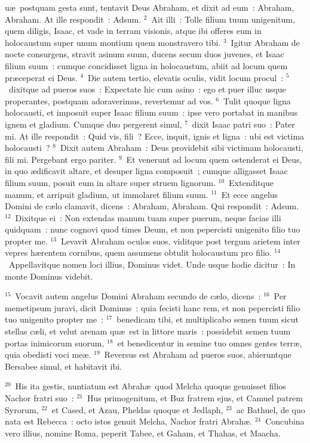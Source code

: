 \bchapter
{}u\ae\ postquam gesta sunt, tentavit Deus Abraham, et dixit ad eum~: Abraham, Abraham. At ille respondit~: Adsum.
${}^{2}$~Ait illi~: Tolle filium tuum unigenitum, quem diligis, Isaac, et vade in terram visionis, atque ibi offeres eum in holocaustum super unum montium quem monstravero tibi.
${}^{3}$~Igitur Abraham de nocte consurgens, stravit asinum suum, ducens secum duos juvenes, et Isaac filium suum~: cumque concidisset ligna in holocaustum, abiit ad locum quem pr\ae ceperat ei Deus.
${}^{4}$~Die autem tertio, elevatis oculis, vidit locum procul~:
${}^{5}$~dixitque ad pueros suos~: Expectate hic cum asino~: ego et puer illuc usque properantes, postquam adoraverimus, revertemur ad vos.
${}^{6}$~Tulit quoque ligna holocausti, et imposuit super Isaac filium suum~: ipse vero portabat in manibus ignem et gladium. Cumque duo pergerent simul,
${}^{7}$~dixit Isaac patri suo~: Pater mi. At ille respondit~: Quid vis, fili~? Ecce, inquit, ignis et ligna~: ubi est victima holocausti~?
${}^{8}$~Dixit autem Abraham~: Deus providebit sibi victimam holocausti, fili mi. Pergebant ergo pariter.
${}^{9}$~Et venerunt ad locum quem ostenderat ei Deus, in quo \ae dificavit altare, et desuper ligna composuit~; cumque alligasset Isaac filium suum, posuit eum in altare super struem lignorum.
${}^{10}$~Extenditque manum, et arripuit gladium, ut immolaret filium suum.
${}^{11}$~Et ecce angelus Domini de c\ae lo clamavit, dicens~: Abraham, Abraham. Qui respondit~: Adsum.
${}^{12}$~Dixitque ei~: Non extendas manum tuam super puerum, neque facias illi quidquam~: nunc cognovi quod times Deum, et non pepercisti unigenito filio tuo propter me.
${}^{13}$~Levavit Abraham oculos suos, viditque post tergum arietem inter vepres h\ae rentem cornibus, quem assumens obtulit holocaustum pro filio.
${}^{14}$~Appellavitque nomen loci illius, Dominus videt. Unde usque hodie dicitur~: In monte Dominus videbit.


${}^{15}$~Vocavit autem angelus Domini Abraham secundo de c\ae lo, dicens~:
${}^{16}$~Per memetipsum juravi, dicit Dominus~: quia fecisti hanc rem, et non pepercisti filio tuo unigenito propter me~:
${}^{17}$~benedicam tibi, et multiplicabo semen tuum sicut stellas c\ae li, et velut arenam qu\ae\ est in littore maris~: possidebit semen tuum portas inimicorum suorum,
${}^{18}$~et benedicentur in semine tuo omnes gentes terr\ae , quia obedisti voci me\ae .
${}^{19}$~Reversus est Abraham ad pueros suos, abieruntque Bersabee simul, et habitavit ibi.


${}^{20}$~His ita gestis, nuntiatum est Abrah\ae\ quod Melcha quoque genuisset filios Nachor fratri suo~:
${}^{21}$~Hus primogenitum, et Buz fratrem ejus, et Camuel patrem Syrorum,
${}^{22}$~et Cased, et Azau, Pheldas quoque et Jedlaph,
${}^{23}$~ac Bathuel, de quo nata est Rebecca~: octo istos genuit Melcha, Nachor fratri Abrah\ae .
${}^{24}$~Concubina vero illius, nomine Roma, peperit Tabee, et Gaham, et Thahas, et Maacha.

